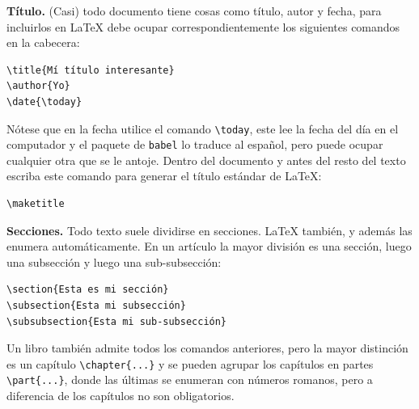 \textbf{Título.} (Casi) todo documento tiene cosas como título, autor y fecha, para incluirlos en \LaTeX{} debe ocupar correspondientemente los siguientes comandos en la cabecera:
\begin{lstlisting}
\title{Mí título interesante}
\author{Yo}
\date{\today}
\end{lstlisting}
Nótese que en la fecha utilice el comando \lstinline|\today|, este lee la fecha del día en el computador y el paquete de \texttt{babel} lo traduce al español, pero puede ocupar cualquier otra que se le antoje. Dentro del documento y antes del resto del texto escriba este comando para generar el título estándar de \LaTeX{}:
\begin{lstlisting}
\maketitle
\end{lstlisting}

\textbf{Secciones.} Todo texto suele dividirse en secciones. \LaTeX{} también, y además las enumera automáticamente. En un artículo la mayor división es una sección, luego una subsección y luego una sub-subsección:
\begin{lstlisting}
\section{Esta es mi sección}
\subsection{Esta mi subsección}
\subsubsection{Esta mi sub-subsección}
\end{lstlisting}
Un libro también admite todos los comandos anteriores, pero la mayor distinción es un capítulo \lstinline|\chapter{...}|
y se pueden agrupar los capítulos en partes \lstinline|\part{...}|,
donde las últimas se enumeran con números romanos, pero a diferencia de los capítulos no son obligatorios.

